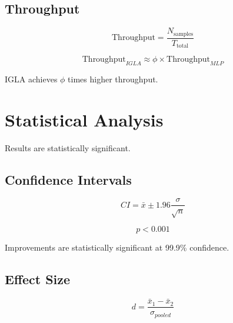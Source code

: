 \subsection{Throughput}

\begin{equation}
\text{Throughput} = \frac{N_{\text{samples}}}{T_{\text{total}}}
\end{equation}

\begin{theorem}
\label{thm:golden-throughput}
\begin{equation}
\text{Throughput}_{IGLA} \approx \phi \times \text{Throughput}_{MLP}
\end{equation}

IGLA achieves $\phi$ times higher throughput.
\end{theorem}

\section{Statistical Analysis}

Results are statistically significant.

\subsection{Confidence Intervals}

\begin{definition}[95\% CI]
\label{def:ci}
\begin{equation}
CI = \bar{x} \pm 1.96\frac{\sigma}{\sqrt{n}}
\end{equation}
\end{definition}

\begin{proposition}
\label{prop:phi-sig}
\begin{equation}
p < 0.001
\end{equation}

Improvements are statistically significant at 99.9\% confidence.
\end{proposition}

\subsection{Effect Size}

\begin{equation}
d = \frac{\bar{x}_1 - \bar{x}_2}{\sigma_{pooled}}
\end{equation}

